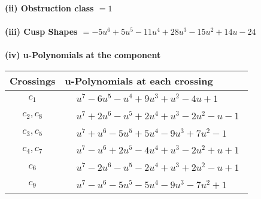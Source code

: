 \documentclass[1p]{elsarticle_modified}
\theoremstyle{definition}
\begin{document}
\flushleft \textbf{(ii) Obstruction class $= 1$}\\~\\
\flushleft \textbf{(iii) Cusp Shapes $= -5 u^6+5 u^5-11 u^4+28 u^3-15 u^2+14 u-24$}\\~\\
\newpage\renewcommand{\arraystretch}{1}
\flushleft \textbf{(iv) u-Polynomials at the component}\newline \\
\begin{tabular}{m{50pt}|m{274pt}}
Crossings & \hspace{64pt}u-Polynomials at each crossing \\
\hline $$\begin{aligned}c_{1}\end{aligned}$$&$\begin{aligned}
&u^7-6 u^5- u^4+9 u^3+u^2-4 u+1
\end{aligned}$\\
\hline $$\begin{aligned}c_{2},c_{8}\end{aligned}$$&$\begin{aligned}
&u^7+2 u^6- u^5+2 u^4+u^3-2 u^2- u-1
\end{aligned}$\\
\hline $$\begin{aligned}c_{3},c_{5}\end{aligned}$$&$\begin{aligned}
&u^7+u^6-5 u^5+5 u^4-9 u^3+7 u^2-1
\end{aligned}$\\
\hline $$\begin{aligned}c_{4},c_{7}\end{aligned}$$&$\begin{aligned}
&u^7- u^6+2 u^5-4 u^4+u^3-2 u^2+u+1
\end{aligned}$\\
\hline $$\begin{aligned}c_{6}\end{aligned}$$&$\begin{aligned}
&u^7-2 u^6- u^5-2 u^4+u^3+2 u^2- u+1
\end{aligned}$\\
\hline $$\begin{aligned}c_{9}\end{aligned}$$&$\begin{aligned}
&u^7- u^6-5 u^5-5 u^4-9 u^3-7 u^2+1
\end{aligned}$\\

\end{tabular}
\end{document}
